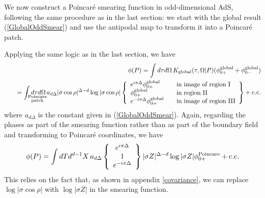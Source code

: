 \documentclass[12pt]{article}
\begin{document}
We now construct a Poincar\'e smearing function in odd-dimensional
AdS, following the same procedure as in the last section: we start
with the global result (\ref{GlobalOddSmear}) and use the antipodal
map to transform it into a Poincar\'e patch.

Applying the same logic as in the last section, we have
\begin{eqnarray*}
& & \phi(P) = \int d\tau d\Omega \, K_{\rm global}(\tau,\Omega \vert P) (\phi_{0+}^{\rm global} + \phi_{0-}^{\rm global}) \\
& & \quad = \int_{{\scriptstyle \rm Poincare} \atop {\scriptstyle \rm patch}} \hspace{-1cm} d\tau d\Omega \, a_{d\Delta}
\vert \sigma \cos \rho \vert^{\Delta - d} \log \vert \sigma \cos \rho \vert
\left\lbrace \begin{array}{ll}
e^{i \pi \Delta}  \phi_{0+}^{\rm global} & \quad \hbox{\rm in image of region I} \\
                  \phi_{0+}^{\rm global} & \quad \hbox{\rm in region II} \\
e^{-i \pi \Delta} \phi_{0+}^{\rm global} & \quad \hbox{\rm in image of region III}
\end{array}\right\rbrace + {\rm c.c.}
\end{eqnarray*}
where $a_{d\Delta}$ is the constant given in (\ref{GlobalOddSmear}).  Again, regarding the phases as part of the
smearing function rather than as part of the boundary field and transforming to Poincar\'e coordinates, we have
\begin{equation}
\phi(P) = \int dT d^{d-1}X \, a_{d\Delta}
\left\lbrace\begin{array}{c}
e^{i \pi \Delta} \\
1 \\
e^{-i \pi \Delta}
\end{array}\right\rbrace
\vert \sigma Z \vert^{\Delta - d} \log \vert \sigma Z \vert
\phi_{0+}^{\rm Poincare} + {\rm c.c.}
\end{equation}
This relies on the fact that, as shown in appendix \ref{covariance}, we can replace
$\log \vert \sigma \cos \rho \vert$ with $\log \vert \sigma Z \vert$ in the smearing
function.
\end{document}
